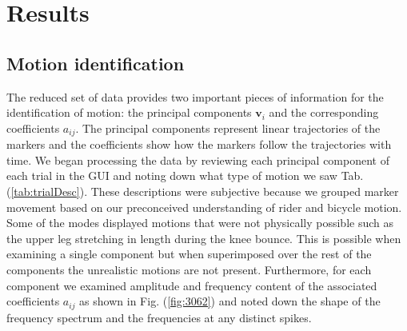 \section{Results}
\label{sec:results}
\subsection{Motion identification}
\label{sec:motionId}
The reduced set of data provides two important pieces of information for the identification of motion: the principal components $\mathbf{v}_i$ and the corresponding coefficients $a_{ij}$. The principal components represent linear trajectories of the markers and the coefficients show how the markers follow the trajectories with time. We began processing the data by reviewing each principal component of each trial in the GUI and noting down what type of motion we saw Tab. (\ref{tab:trialDesc}). These descriptions were subjective because we grouped marker movement based on our preconceived understanding of rider and bicycle motion. Some of the modes displayed motions that were not physically possible such as the upper leg stretching in length during the knee bounce. This is possible when examining a single component but when superimposed over the rest of the components the unrealistic motions are not present. Furthermore, for each component we examined amplitude and frequency content of the associated coefficients $a_{ij}$ as shown in Fig. (\ref{fig:3062}) and noted down the shape of the frequency spectrum and the frequencies at any distinct spikes.

